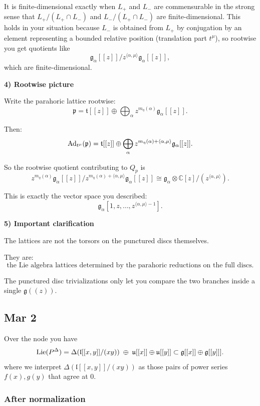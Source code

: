 \documentclass[12pt]{article}
\begin{document}
It is finite-dimensional exactly when $L_+$ and $L_-$ are commensurable in the strong sense that $L_+ / (L_+ \cap L_-)$ and $L_- / (L_+ \cap L_-)$ are finite-dimensional. This holds in your situation because $L_-$ is obtained from $L_+$ by conjugation by an element representing a bounded relative position (translation part $t^\mu$), so rootwise you get quotients like
\[
\mathfrak{g}_\alpha[[z]] / z^{\langle \alpha, \mu \rangle} \mathfrak{g}_\alpha[[z]],
\]
which are finite-dimensional.

\noindent\textbf{4) Rootwise picture}

Write the parahoric lattice rootwise:
\[
\mathfrak{p}
=
\mathfrak{t}[[z]]
\oplus
\bigoplus_{\alpha}
z^{m_\eta(\alpha)}\mathfrak{g}_\alpha[[z]].
\]

Then:
\[
\operatorname{Ad}_{t^\mu}(\mathfrak{p})
=
\mathfrak{t}[[z]]
\oplus
\bigoplus_{\alpha}
z^{m_\eta(\alpha)+\langle\alpha,\mu\rangle}
\mathfrak{g}_\alpha[[z]].
\]

So the rootwise quotient contributing to $Q_p$ is
\[
z^{m_\eta(\alpha)}\mathfrak{g}_\alpha[[z]]
\Big/
z^{m_\eta(\alpha)+\langle\alpha,\mu\rangle}
\mathfrak{g}_\alpha[[z]]
\cong
\mathfrak{g}_\alpha\otimes
\mathbb{C}[z]/(z^{\langle\alpha,\mu\rangle}).
\]

This is exactly the vector space you described:
\[
\mathfrak{g}_\alpha[1,z,\dots,z^{\langle\alpha,\mu\rangle-1}].
\]

\medskip

\noindent\textbf{5) Important clarification}

The lattices are not the torsors on the punctured discs themselves.

They are:
\[
\boxed{
\text{the Lie algebra lattices determined by the parahoric reductions on the full discs.}
}
\]

The punctured disc trivializations only let you compare the two branches inside a single $\mathfrak{g}((z))$.

\subsection{Mar 2}

Over the node you have
\[
\operatorname{Lie}(P^\Delta)
=
\Delta(\mathfrak l[[x,y]]/(xy))
\;\oplus\;
\mathfrak u[[x]] \oplus \mathfrak u[[y]] \subset \mathfrak{g}[[x]] \oplus \mathfrak{g}[[y]]].
\]
where we interpret $\Delta(\mathfrak l[[x,y]]/(xy))$ as those pairs of power series $f(x),g(y)$ that agree at $0$.

\subsubsection*{After normalization}
\end{document}
